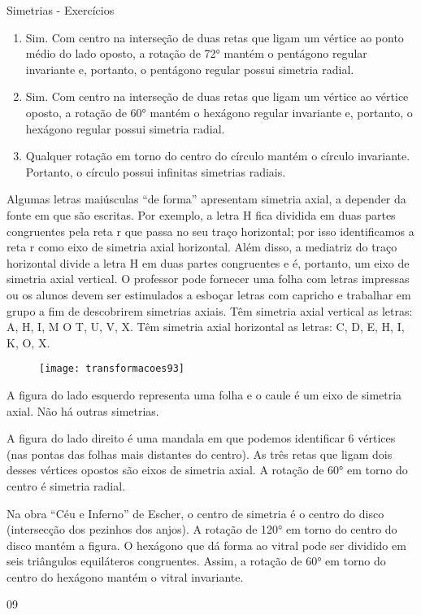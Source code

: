 \begin{sugestions}{Simetrias - Exercícios}
{\begin{enumerate}[label=\textit{\alph*)}]
\item Sim. Com centro na interseção de duas retas que ligam um vértice ao ponto médio do lado oposto, a rotação de 72° mantém o pentágono regular invariante e, portanto, o pentágono regular possui simetria radial.
\item Sim. Com centro na interseção de duas retas que ligam um vértice ao vértice oposto, a rotação de 60° mantém o hexágono regular invariante e, portanto, o hexágono regular possui simetria radial. 
\item Qualquer rotação em torno do centro do círculo mantém o círculo invariante. Portanto, o círculo possui infinitas simetrias radiais.
\end{enumerate}

 Algumas letras maiúsculas “de forma” apresentam simetria axial, a depender da fonte em que são escritas. Por exemplo, a letra H fica dividida em duas partes congruentes pela reta r que passa no seu traço horizontal; por isso identificamos a reta r como eixo de simetria axial horizontal.  Além disso, a mediatriz do traço horizontal divide a letra H em duas partes congruentes e é, portanto, um eixo de simetria axial vertical.  O professor pode fornecer uma folha com letras impressas ou os alunos devem ser estimulados a esboçar letras com capricho e trabalhar em grupo a fim de descobrirem simetrias axiais. Têm simetria axial vertical as letras: A, H, I, M O T, U, V, X. Têm simetria axial horizontal as letras: C, D, E, H, I, K, O, X.

 \begin{figure}[H]
 \centering
 
 \texttt{[image: transformacoes93]}
 \end{figure}

A figura do lado esquerdo representa uma folha e o caule é um eixo de simetria axial. Não há outras simetrias.

A figura do lado direito é uma mandala em que podemos identificar 6 vértices (nas pontas das folhas mais distantes do centro). As três retas que ligam dois desses vértices opostos são eixos de simetria axial. A rotação de 60° em torno do centro é simetria radial.  


Na obra “Céu e Inferno” de Escher, o centro de simetria é o centro do disco (intersecção dos pezinhos dos anjos). A rotação de 120° em torno do centro do disco mantém a figura. O hexágono que dá forma ao vitral pode ser dividido em seis triângulos equiláteros congruentes. Assim, a rotação de 60° em torno do centro do hexágono mantém o vitral invariante.   
}{0}{9}
\end{sugestions}
